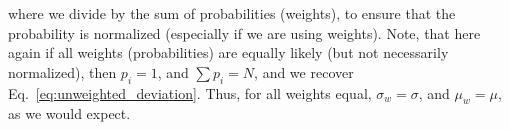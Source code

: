 \documentclass[fleqn,usenatbib]{mnras}  %
\begin{document}
where we divide by the sum of probabilities (weights), to ensure that the probability is normalized (especially if we are using weights). Note, that here again if all weights (probabilities) are equally likely (but not necessarily normalized), then $p_{i} = 1$, and $\sum p_{i}= N$, and we recover Eq.~\ref{eq:unweighted_deviation}. Thus, for all weights equal, $\sigma_{w} = \sigma$, and $\mu_{w} = \mu$, as we would expect. 










\bsp	%
\label{lastpage}
\end{document}
